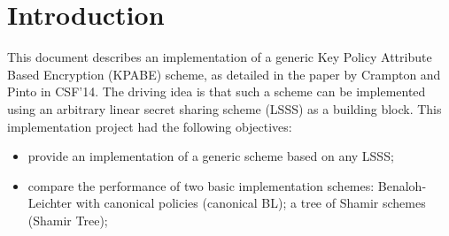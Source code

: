 \documentclass{article}
\begin{document}
\newcommand{\code}[1]{{\tt #1}\xspace}


\newcommand{\cKPABE}{\code{KPABE}}
\newcommand{\cSS}{\code{SecretSharing}}
\newcommand{\cAP}{\code{AccessPolicy}}
\newcommand{\cST}{\code{ShareTuple}}
\newcommand{\cBLcanon}{\code{BLSS}}
\newcommand{\cBLcanonAP}{\code{BLAccessPolicy}}
\newcommand{\cShTree}{\code{ShTreeSS}}
\newcommand{\cShTreeAP}{\code{ShTreeAccessPolicy}}
\newcommand{\cnode}{\code{NodeContent}}
\newcommand{\ctree}{\code{TreeNode}}
\newcommand{\cBig}{\code{Big}}

\newcommand{\cstring}{\code{std::string}}

\newcommand{\fmake}{\code{make}}
\newcommand{\fhkpabe}{\code{kpabe.h}}
\newcommand{\fckpabe}{\code{kpabe.cpp}}
\newcommand{\ftkpabe}{\code{testkpabe.cpp}}
\newcommand{\fhss}{\code{secretsharing.h}}
\newcommand{\fcss}{\code{secretsharing.cpp}}
\newcommand{\fhblcanon}{\code{BLcanonical.h}}
\newcommand{\fcblcanon}{\code{BLcanonical.cpp}}
\newcommand{\ftblcanon}{\code{testBLcanonical.cpp}}
\newcommand{\fhshtree}{\code{ShTree.h}}
\newcommand{\fcshtree}{\code{ShTree.cpp}}
\newcommand{\ftshtree}{\code{testShTree.cpp}}
\newcommand{\fhtree}{\code{tree.h}}
\newcommand{\fctree}{\code{tree.cpp}}
\newcommand{\fttree}{\code{testtree.cpp}}
\newcommand{\fhutils}{\code{utils.h}}
\newcommand{\fcutils}{\code{utils.cpp}}
\newcommand{\ftutils}{\code{testutils.cpp}}





\section{Introduction}

This document describes an implementation of a generic Key Policy Attribute Based Encryption (KPABE) scheme, as detailed in the paper by Crampton and Pinto in CSF'14. The driving idea is that such a scheme can be implemented using an arbitrary linear secret sharing scheme (LSSS) as a building block. This implementation project had the following objectives:
\begin{itemize}
\item provide an implementation of a generic scheme based on any LSSS;
\item compare the performance of two basic implementation schemes: Benaloh-Leichter with canonical policies (canonical BL); a tree of Shamir schemes (Shamir Tree);
\end{itemize}
\end{document}
